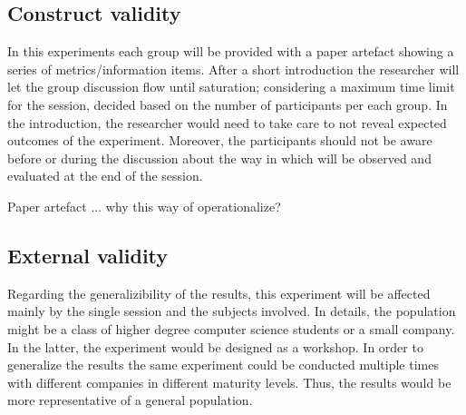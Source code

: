 \documentclass[runningheads]{llncs}
\begin{document}
\subsection{Construct validity}

In this experiments each group will be provided with a paper artefact showing a series of metrics/information items. After a short introduction the researcher will let the group discussion flow until saturation; considering a maximum time limit for the session, decided based on the number of participants per each group. In the introduction, the researcher would need to take care to not reveal expected outcomes of the experiment. Moreover, the participants should not be aware before or during the discussion about the way in which will be observed and evaluated at the end of the session.

Paper artefact ... why this way of operationalize?

\subsection{External validity}

Regarding the generalizibility of the results, this experiment will be affected mainly by the single session and the subjects involved. In details, the population might be a class of higher degree computer science students or a small company. In the latter, the experiment would be designed as a workshop. In order to generalize the results the same experiment could be conducted multiple times with different companies in different maturity levels. Thus, the results would be more representative of a general population.



%
%
%
% 
% 
%
\end{document}
